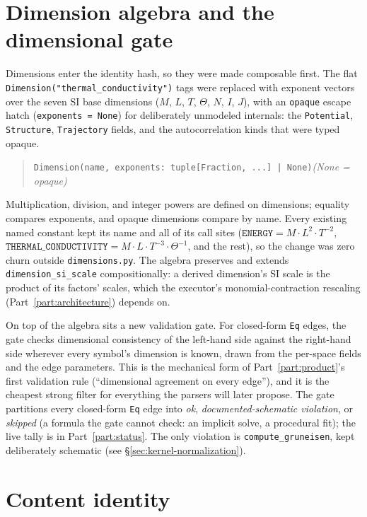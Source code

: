 \documentclass[11pt,a4paper]{article}
\begin{document}
\section{Dimension algebra and the dimensional gate}
\label{sec:kernel-dimensions}

Dimensions enter the identity hash, so they were made composable first. The flat
\texttt{Dimension("thermal\_conductivity")} tags were replaced with exponent
vectors over the seven SI base dimensions ($M$, $L$, $T$, $\Theta$, $N$, $I$,
$J$), with an \texttt{opaque} escape hatch (\texttt{exponents = None}) for
deliberately unmodeled internals: the \texttt{Potential}, \texttt{Structure},
\texttt{Trajectory} fields, and the autocorrelation kinds that were typed opaque.
\begin{quote}
\texttt{Dimension(name, exponents: tuple[Fraction, ...] | None)}\quad\emph{(None = opaque)}
\end{quote}
Multiplication, division, and integer powers are defined on dimensions; equality
compares exponents, and opaque dimensions compare by name. Every existing named
constant kept its name and all of its call sites ($\mathtt{ENERGY} = M\cdot
L^2\cdot T^{-2}$, $\mathtt{THERMAL\_CONDUCTIVITY} = M\cdot L\cdot T^{-3}\cdot
\Theta^{-1}$, and the rest), so the change was zero churn outside
\texttt{dimensions.py}. The algebra preserves and extends \texttt{dimension\_si\_scale}
compositionally: a derived dimension's SI scale is the product of its factors'
scales, which the executor's monomial-contraction rescaling (Part~\ref{part:architecture})
depends on.

On top of the algebra sits a new validation gate. For closed-form \texttt{Eq}
edges, the gate checks dimensional consistency of the left-hand side against the
right-hand side wherever every symbol's dimension is known, drawn from the
per-space fields and the edge parameters. This is the mechanical form of
Part~\ref{part:product}'s first validation rule (``dimensional agreement on every
edge''), and it is the cheapest strong filter for everything the parsers will
later propose. The gate partitions every closed-form \texttt{Eq} edge into
\emph{ok}, \emph{documented-schematic violation}, or \emph{skipped} (a formula the
gate cannot check: an implicit solve, a procedural fit); the live tally is in
Part~\ref{part:status}. The only violation is \texttt{compute\_gruneisen}, kept
deliberately schematic (see \S\ref{sec:kernel-normalization}).

\section{Content identity}
\label{sec:kernel-identity}
\end{document}
